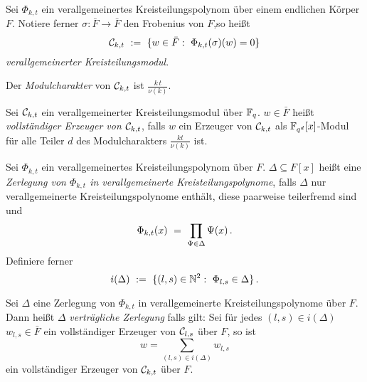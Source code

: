 \begin{definition}
  \label{def:verallgemeinerter_kreisteilungsmodul}
  Sei $\Phi_{k,t}$ ein verallgemeinertes Kreisteilungspolynom über einem
  endlichen Körper $F$. Notiere ferner $\sigma: \bar F\to \bar F$ 
  den Frobenius von $F$,so heißt
  \[ \C_{k,t} \speq{:=} \{ w \in \bar F:\ \Phi_{k,t}(\sigma)(w) = 0 \}\]
  \emph{verallgemeinerter Kreisteilungsmodul}.

  Der \emph{Modulcharakter} von $\mathcal{C}_{k,t}$ ist $\frac{k\,t}{\nu(k)}$.
\end{definition}

\begin{definition}
  \label{def:vollst_erzeuger}
  Sei $\mathcal{C}_{k,t}$ ein verallgemeinerter Kreisteilungsmodul über $\mathbb{F}_q$.
  $w \in \bar F$ heißt 
  \emph{vollständiger Erzeuger von $\mathcal{C}_{k,t}$}, falls
  $w$ ein Erzeuger von $\mathcal{C}_{k,t}$ als $\mathbb{F}_{q^d}[x]$-Modul 
  für alle Teiler $d$ des Modulcharakters $\frac{kt}{\nu(k)}$ ist.
\end{definition}

\begin{definition}
  Sei $\Phi_{k,t}$ ein verallgemeinertes Kreisteilungspolynom über $F$.
  $\Delta \subseteq F[x]$ heißt eine 
  \emph{Zerlegung von $\Phi_{k,t}$ in verallgemeinerte Kreisteilungspolynome}, 
  falls $\Delta$ nur verallgemeinerte Kreisteilungspolynome enthält, diese
  paarweise teilerfremd sind und
  \[ \Phi_{k,t}(x) \ =\  \prod_{\Psi \in \Delta} \Psi(x)\,. \]
  Definiere ferner
  \[ i(\Delta) \speq{:=} \{ (l,s) \in \N^2:\ 
    \Phi_{l,s} \in \Delta\}\,.\]
\end{definition}


\begin{definition}
  \label{def:vertraeglich}
  Sei $\Delta$ eine Zerlegung von $\Phi_{k,t}$ in verallgemeinerte
  Kreisteilungspolynome über $F$.
  Dann heißt $\Delta$ 
  \emph{verträgliche Zerlegung} falls gilt: Sei für jedes 
  $(l,s) \in i(\Delta)$
  $w_{l,s} \in \bar F$ ein vollständiger Erzeuger von 
  $\mathcal{C}_{l,s}$ über $F$,
  so ist 
  \[ w = \sum_{(l,s) \in i(\Delta)} w_{l,s} \]
  ein vollständiger Erzeuger von $\mathcal{C}_{k,t}$ über $F$.
\end{definition}

